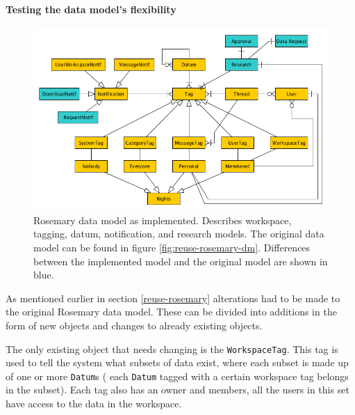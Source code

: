 

\paragraph{Testing the data model's flexibility}
\begin{figure}[!b]
	\centering
	\includegraphics[width=1.0\linewidth]{images/datamodel-adapted}
	\caption{
		Rosemary data model as implemented.
		Describes workspace, tagging, datum, notification, and research models.
		The original data model can be found in figure \ref{fig:reuse-rosemary-dm}.
		Differences between the implemented model and the original model are shown in blue. 
	}
	\label{fig:implementation-rosemary-dm}
\end{figure}

As mentioned earlier in section \ref{reuse-rosemary} alterations had to be made to the original Rosemary data model.
These can be divided into additions in the form of new objects and changes to already existing objects.

The only existing object that needs changing is the {\tt WorkspaceTag}.
This tag is used to tell the system what subsets of data exist, where each subset is made up of one or more {\tt Datum}s (\ie{} each {\tt Datum} tagged with a certain workspace tag belongs in the subset).
Each tag also has an owner and members, all the users in this set have access to the data in the workspace.

